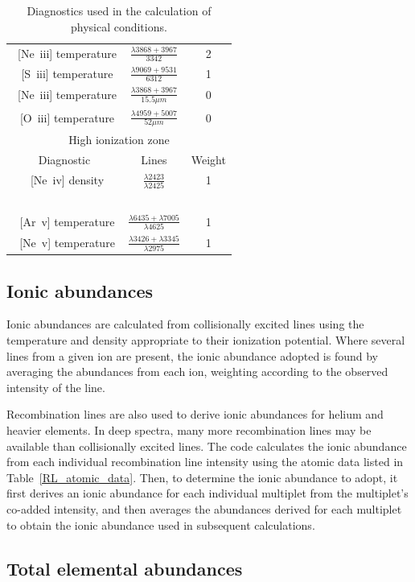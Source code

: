 \documentclass[useAMS,usenatbib]{mn2e}
\begin{document}
\begin{table}
\begin{tabular}{ccc}
~[Ne~{\sc iii}] temperature & $\frac{\lambda 3868 + 3967}{3342}$ & 2\\
~[S~{\sc iii}] temperature & $\frac{\lambda 9069 + 9531}{6312}$ & 1\\
~[Ne~{\sc iii}] temperature & $\frac{\lambda 3868 + 3967}{15.5 \mu m}$ & 0\\
~[O~{\sc iii}] temperature & $\frac{\lambda 4959 + 5007}{52 \mu m}$ & 0\\
\hline
\multicolumn{3}{c}{High ionization zone}\\
\hline
Diagnostic & Lines & Weight \\
~[Ne~{\sc iv}] density & $\frac{\lambda2423}{\lambda2425}$ & 1 \\
~\\
~[Ar~{\sc v}] temperature & $\frac{\lambda 6435 + \lambda7005}{\lambda4625}$ & 1 \\
~[Ne~{\sc v}] temperature & $\frac{\lambda 3426 + \lambda3345}{\lambda2975}$ & 1 \\
\end{tabular}
\caption{Diagnostics used in the calculation of physical conditions.}
\label{zonestable}
\end{table}

\subsection{Ionic abundances}

Ionic abundances are calculated from collisionally excited lines using the temperature and density appropriate to their ionization potential.  Where several lines from a given ion are present, the ionic abundance adopted is found by averaging the abundances from each ion, weighting according to the observed intensity of the line.

Recombination lines are also used to derive ionic abundances for helium and heavier elements.  In deep spectra, many more recombination lines may be available than collisionally excited lines.  The code calculates the ionic abundance from each individual recombination line intensity using the atomic data listed in Table~\ref{RL_atomic_data}.  Then, to determine the ionic abundance to adopt, it first derives an ionic abundance for each individual multiplet from the multiplet's co-added intensity, and then averages the abundances derived for each multiplet to obtain the ionic abundance used in subsequent calculations.

\subsection{Total elemental abundances}
\end{document}
